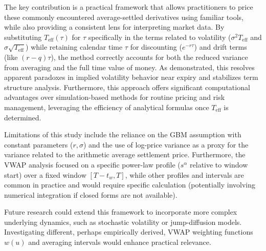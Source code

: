 \documentclass[11pt]{article}
\theoremstyle{plain}
\begin{document}
The key contribution is a practical framework that allows practitioners to price these commonly encountered average-settled derivatives using familiar tools, while also providing a consistent lens for interpreting market data. By substituting $T_{\mathrm{eff}}(\tau)$ for $\tau$ specifically in the terms related to volatility ($\sigma^2 T_{\mathrm{eff}}$ and $\sigma \sqrt{T_{\mathrm{eff}}}$) while retaining calendar time $\tau$ for discounting ($e^{-r\tau}$) and drift terms (like $(r-q)\tau$), the method correctly accounts for both the reduced variance from averaging and the full time value of money. As demonstrated, this resolves apparent paradoxes in implied volatility behavior near expiry and stabilizes term structure analysis. Furthermore, this approach offers significant computational advantages over simulation-based methods for routine pricing and risk management, leveraging the efficiency of analytical formulas once $T_{\mathrm{eff}}$ is determined.

Limitations of this study include the reliance on the GBM assumption with constant parameters ($r, \sigma$) and the use of log-price variance as a proxy for the variance related to the arithmetic average settlement price. Furthermore, the VWAP analysis focused on a specific power-law profile ($s^\alpha$ relative to window start) over a fixed window $[T-t_w, T]$, while other profiles and intervals are common in practice and would require specific calculation (potentially involving numerical integration if closed forms are not available).

Future research could extend this framework to incorporate more complex underlying dynamics, such as stochastic volatility or jump-diffusion models. Investigating different, perhaps empirically derived, VWAP weighting functions $w(u)$ and averaging intervals would enhance practical relevance.




\end{document}
